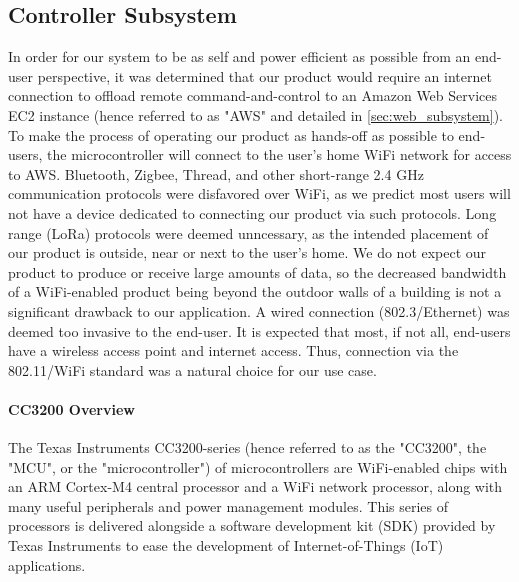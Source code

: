 \subsection{Controller Subsystem}
\label{sec:controller_subsystem}
In order for our system to be as self and power efficient as
possible from an end-user perspective, it was determined that our product
would require an internet connection to offload remote command-and-control
to an Amazon Web Services EC2 instance (hence referred to as "AWS" and detailed in
\autoref{sec:web_subsystem}). To make the process of operating our product 
as hands-off as possible to end-users, the microcontroller will connect to
the user's home WiFi network for access to AWS. Bluetooth, Zigbee, Thread,
and other short-range 2.4 GHz communication protocols were disfavored over
WiFi, as we predict most users will not have a device dedicated to
connecting our product via such protocols. Long range (LoRa) protocols were
deemed unncessary, as the intended placement of our product is outside, 
near or next to the user's home. We do not expect our product to produce
or receive large amounts of data, so the decreased bandwidth of a
WiFi-enabled product being beyond the outdoor walls of a building
is not a significant drawback to our application. A wired connection
(802.3/Ethernet) was deemed too invasive to the end-user. It is expected
that most, if not all, end-users have a wireless access point and internet
access. Thus, connection via the 802.11/WiFi standard was a natural choice
for our use case.

\paragraph{CC3200 Overview}
The Texas Instruments CC3200-series (hence referred to as the "CC3200", the
"MCU", or the "microcontroller") of microcontrollers are WiFi-enabled
chips with an ARM Cortex-M4 central processor and a WiFi network processor,
along with many useful peripherals and power management modules. This
series of processors is delivered alongside a software development kit
(SDK) provided by Texas Instruments to ease the development of
Internet-of-Things (IoT) applications.

